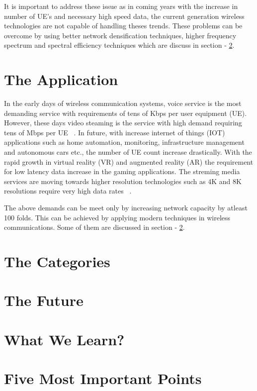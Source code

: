 \documentclass[12pt,onecolumn]{IEEEtran}
\begin{document}
It is important to address these issue as in coming years with the increase in number of UE's and necessary high speed data, the current generation wireless technologies are not capable of handling theses trends. These problems can be overcome by using better network densification techniques, higher frequency spectrum and spectral efficiency techniques which are discuss in section - \ref{sec:TC}.


\section{The Application}
\label{sec:TA}

In the early days of wireless communication systems, voice service is the most demanding service with requirements of tens of Kbps per user equipment (UE). However, these days video steaming is the service with high demand requiring tens of Mbps per UE ~\cite{stream_vid}. 
In future, with increase internet of things (IOT) applications such as home automation, monitoring, infrastructure management and autonomous cars etc., the number of UE count increase drastically. 
With the rapid growth in virtual reality (VR) and augmented reality (AR) the requirement for low latency data increase in the gaming applications. 
The streming media services are moving towards higher resolution technologies such as 4K and 8K resolutions require very high data rates ~\cite{youtube}.

The above demands can be meet only by increasing network capacity by atleast 100 folds. This can be achieved by applying modern techniques in wireless communications. Some of them are discussed in section - \ref{sec:TC}.

\section{The Categories}  
\label{sec:TC}

\section{The Future}
\label{sec:TF}

\section{What We Learn?}
\label{sec:WWL}

\section{Five Most Important Points}
\label{sec:FMIP}
\ifCLASSOPTIONcaptionsoff
  \newpage
\fi



\end{document}
